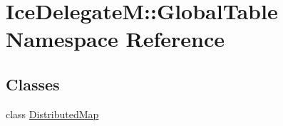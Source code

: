 \hypertarget{namespace_ice_delegate_m_1_1_global_table}{
\section{IceDelegateM::GlobalTable Namespace Reference}
\label{namespace_ice_delegate_m_1_1_global_table}
}
\subsection*{Classes}
\begin{DoxyCompactItemize}
\item 
class \hyperlink{class_ice_delegate_m_1_1_global_table_1_1_distributed_map}{DistributedMap}
\end{DoxyCompactItemize}
